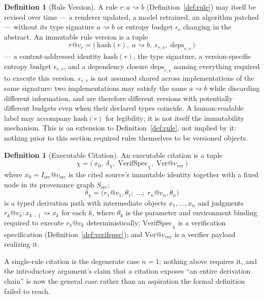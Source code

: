 \documentclass[11pt]{article}
\theoremstyle{definition}
\newtheorem{definition}[theorem]{Definition}
\begin{document}
\begin{definition}[Rule Version]
\label{def:rule-version}
A rule $r : a \rightsquigarrow b$ (Definition~\ref{def:rule}) may itself be revised over time --- a renderer updated, a model retrained, an algorithm patched --- without its type signature $a \rightsquigarrow b$ or entropy budget $\epsilon_r$ changing in the abstract. An immutable rule version is a tuple
\[
r@v_r = \big(\, \mathrm{hash}(r),\; a \rightsquigarrow b,\; \epsilon_{r,v},\; \mathrm{deps}_{r,v} \,\big)
\]
--- a content-addressed identity $\mathrm{hash}(r)$, the type signature, a version-specific entropy budget $\epsilon_{r,v}$, and a dependency closure $\mathrm{deps}_{r,v}$ naming everything required to execute this version. $\epsilon_{r,v}$ is not assumed shared across implementations of the same signature: two implementations may satisfy the same $a \rightsquigarrow b$ while discarding different information, and are therefore different versions with potentially different budgets even when their declared types coincide. A human-readable label may accompany $\mathrm{hash}(r)$ for legibility; it is not itself the immutability mechanism. This is an extension to Definition~\ref{def:rule}, not implied by it: nothing prior to this section required rules themselves to be versioned objects.
\end{definition}

\begin{definition}[Executable Citation]
\label{def:executable-citation}
An executable citation is a tuple
\[
\chi = \big(\, x_0,\; \delta_\chi,\; \mathrm{VerifSpec}_\chi,\; \mathrm{Ver}@v_{\mathrm{ver}} \,\big)
\]
where $x_0 = I_{\mathrm{src}}@v_{\mathrm{src}}$ is the cited source's immutable identity together with a fixed node in its provenance graph $S_{\mathrm{src}}$;
\[
\delta_\chi = \big(r_1@v_1,\theta_1;\; \ldots;\; r_n@v_n,\theta_n\big)
\]
is a typed derivation path with intermediate objects $x_1,\ldots,x_n$ and judgments $r_k@v_k : x_{k-1} \rightsquigarrow x_k$ for each $k$, where $\theta_k$ is the parameter and environment binding required to execute $r_k@v_k$ deterministically; $\mathrm{VerifSpec}_\chi$ is a verification specification (Definition~\ref{def:verifspec}); and $\mathrm{Ver}@v_{\mathrm{ver}}$ is a verifier payload realizing it.
\end{definition}

A single-rule citation is the degenerate case $n=1$; nothing above requires it, and the introductory argument's claim that a citation exposes ``an entire derivation chain'' is now the general case rather than an aspiration the formal definition failed to reach.
\end{document}
